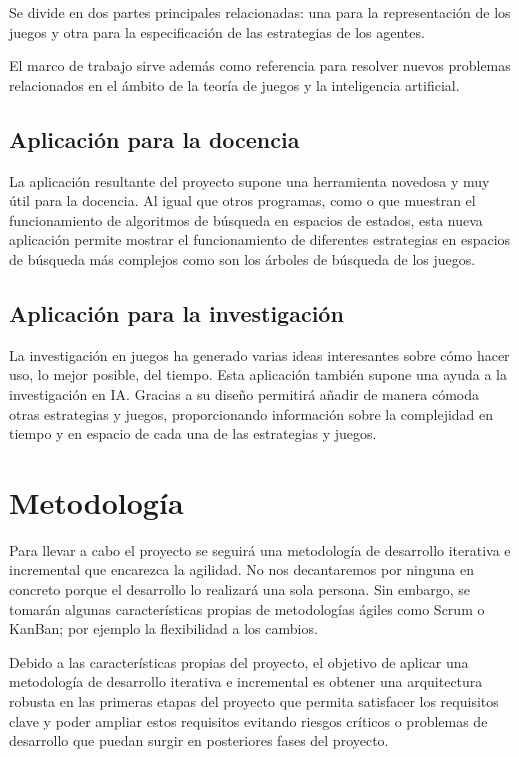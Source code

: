\documentclass[a4paper,12pt]{article}
\begin{document}
\par 
Se divide en dos partes principales relacionadas: una para la representación de los juegos y otra para la especificación de las estrategias de los agentes.

\par 
El marco de trabajo sirve además como referencia para resolver nuevos problemas relacionados en el ámbito de la teoría de juegos y la inteligencia artificial.


\subsection{Aplicación para la docencia} 
\par 
La aplicación resultante del proyecto supone una herramienta novedosa y muy útil para la docencia.
Al igual que otros programas, como \cite{PathDemo} o \cite{AIDA} que muestran el funcionamiento de algoritmos de búsqueda en espacios de estados, esta nueva aplicación permite mostrar el funcionamiento de diferentes estrategias en espacios de búsqueda más complejos como son los árboles de búsqueda de los juegos.


\subsection{Aplicación para la investigación} 
\par 
La investigación en juegos ha generado varias ideas interesantes sobre cómo hacer uso, lo mejor posible, del tiempo.
Esta aplicación también supone una ayuda a la investigación en IA.
Gracias a su diseño permitirá añadir de manera cómoda otras estrategias y juegos, proporcionando información sobre la complejidad en tiempo y en espacio de cada una de las estrategias y juegos.


\section{Metodología}
\par 
Para llevar a cabo el proyecto se seguirá una metodología de desarrollo iterativa e incremental que encarezca la agilidad.
No nos decantaremos por ninguna en concreto porque el desarrollo lo realizará una sola persona.
Sin embargo, se tomarán algunas características propias de metodologías ágiles como Scrum o KanBan; por ejemplo la flexibilidad a los cambios.

\par 
Debido a las características propias del proyecto, el objetivo de aplicar una metodología de desarrollo iterativa e incremental es obtener una arquitectura robusta en las primeras etapas del proyecto que permita satisfacer los requisitos clave y poder ampliar estos requisitos evitando riesgos críticos o problemas de desarrollo que puedan surgir en posteriores fases del proyecto.
\end{document}
